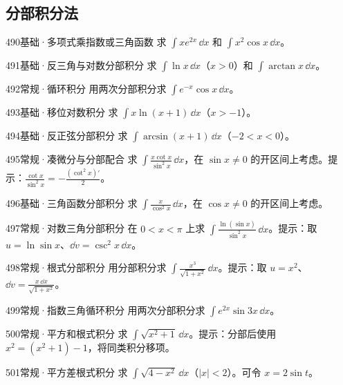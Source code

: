 \subsection{分部积分法}
\begin{exercise}{490}{基础·多项式乘指数或三角函数}
求 $\int xe^{2x}\,\dd x$ 和 $\int x^2\cos x\,\dd x$。
\end{exercise}
\begin{exercise}{491}{基础·反三角与对数分部积分}
求 $\int\ln x\,\dd x$（$x>0$）和 $\int\arctan x\,\dd x$。
\end{exercise}
\begin{exercise}{492}{常规·循环积分}
用两次分部积分求 $\int e^{-x}\cos x\,\dd x$。
\end{exercise}
\begin{exercise}{493}{基础·移位对数积分}
求 $\int x\ln(x+1)\,\dd x$（$x>-1$）。
\end{exercise}
\begin{exercise}{494}{基础·反正弦分部积分}
求 $\int\arcsin(x+1)\,\dd x$（$-2<x<0$）。
\end{exercise}
\begin{exercise}{495}{常规·凑微分与分部配合}
求 $\int\frac{x\cot x}{\sin^2x}\,\dd x$，在 $\sin x\ne0$ 的开区间上考虑。提示：$\frac{\cot x}{\sin^2x}=-\frac{(\cot^2x)'}{2}$。
\end{exercise}
\begin{exercise}{496}{基础·三角函数分部积分}
求 $\int\frac{x}{\cos^2x}\,\dd x$，在 $\cos x\ne0$ 的开区间上考虑。
\end{exercise}
\begin{exercise}{497}{常规·对数三角分部积分}
在 $0<x<\pi$ 上求 $\int\frac{\ln(\sin x)}{\sin^2x}\,\dd x$。提示：取 $u=\ln\sin x$、$\dd v=\csc^2x\,\dd x$。
\end{exercise}
\begin{exercise}{498}{常规·根式分部积分}
用分部积分求 $\int\frac{x^3}{\sqrt{1+x^2}}\,\dd x$。提示：取 $u=x^2$、$\dd v=\frac{x\,\dd x}{\sqrt{1+x^2}}$。
\end{exercise}
\begin{exercise}{499}{常规·指数三角循环积分}
用两次分部积分求 $\int e^{2x}\sin3x\,\dd x$。
\end{exercise}
\begin{exercise}{500}{常规·平方和根式积分}
求 $\int\sqrt{x^2+1}\,\dd x$。提示：分部后使用 $x^2=(x^2+1)-1$，将同类积分移项。
\end{exercise}
\begin{exercise}{501}{常规·平方差根式积分}
求 $\int\sqrt{4-x^2}\,\dd x$（$|x|<2$）。可令 $x=2\sin t$。
\end{exercise}
